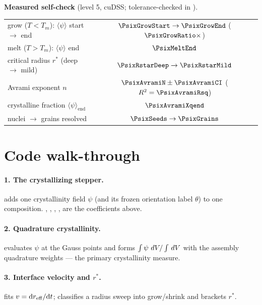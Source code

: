 \begin{keybox}
\textbf{Measured self-check} (level 5, cuDSS; tolerance-checked in
).
\begin{center}\small
\begin{tabular}{lc}
\toprule
grow ($T<T_m$): $\langle\psi\rangle$ start $\to$ end & $\ensuremath{\PsixGrowStart} \to \ensuremath{\PsixGrowEnd}$ ($\ensuremath{\PsixGrowRatio}\times$) \\
melt ($T>T_m$): $\langle\psi\rangle$ end & $\ensuremath{\PsixMeltEnd}$ \\
critical radius $r^\ast$ (deep $\to$ mild) & $\ensuremath{\PsixRstarDeep} \to \ensuremath{\PsixRstarMild}$ \\
Avrami exponent $n$ & $\ensuremath{\PsixAvramiN}\pm\ensuremath{\PsixAvramiCI}$ ($R^2=\ensuremath{\PsixAvramiRsq}$) \\
crystalline fraction $\langle\psi\rangle_{\text{end}}$ & $\ensuremath{\PsixAvramiXqend}$ \\
nuclei $\to$ grains resolved & $\ensuremath{\PsixSeeds} \to \ensuremath{\PsixGrains}$ \\
\bottomrule
\end{tabular}
\end{center}
\end{keybox}

\section{Code walk-through}

\paragraph{1. The crystallizing stepper.}  adds one crystallinity field $\psi$ (and its
frozen orientation label $\theta$) to one composition. ,
, , ,  are the coefficients above.

\paragraph{2. Quadrature crystallinity.}  evaluates
$\psi$ at the Gauss points and forms $\int\psi\,\,dV/\int\,dV$ with the
assembly quadrature weights --- the primary crystallinity measure.

\paragraph{3. Interface velocity and $r^\ast$.}
 fits $v=\mathrm{d}r_{\rm eff}/\mathrm{d}t$;
 classifies a radius sweep into grow/shrink and
brackets $r^\ast$.

